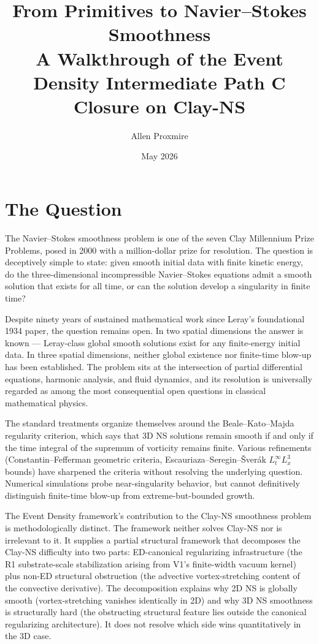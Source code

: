 \documentclass[11pt,a4paper]{article}
\title{\vspace{-1cm}\Large\bfseries From Primitives to Navier--Stokes Smoothness\\[6pt]
\large\mdseries A Walkthrough of the Event Density Intermediate Path C Closure on Clay-NS}
\author{Allen Proxmire}
\date{May 2026}
\begin{document}
\maketitle
\thispagestyle{empty}

\section{The Question}

The Navier--Stokes smoothness problem is one of the seven Clay Millennium Prize Problems, posed in 2000 with a million-dollar prize for resolution. The question is deceptively simple to state: given smooth initial data with finite kinetic energy, do the three-dimensional incompressible Navier--Stokes equations admit a smooth solution that exists for all time, or can the solution develop a singularity in finite time?

Despite ninety years of sustained mathematical work since Leray's foundational 1934 paper, the question remains open. In two spatial dimensions the answer is known --- Leray-class global smooth solutions exist for any finite-energy initial data. In three spatial dimensions, neither global existence nor finite-time blow-up has been established. The problem sits at the intersection of partial differential equations, harmonic analysis, and fluid dynamics, and its resolution is universally regarded as among the most consequential open questions in classical mathematical physics.

The standard treatments organize themselves around the Beale--Kato--Majda regularity criterion, which says that 3D NS solutions remain smooth if and only if the time integral of the supremum of vorticity remains finite. Various refinements (Constantin--Fefferman geometric criteria, Escauriaza--Seregin--\v Sver\'ak $L^\infty_t L^3_x$ bounds) have sharpened the criteria without resolving the underlying question. Numerical simulations probe near-singularity behavior, but cannot definitively distinguish finite-time blow-up from extreme-but-bounded growth.

The Event Density framework's contribution to the Clay-NS smoothness problem is methodologically distinct. The framework neither solves Clay-NS nor is irrelevant to it. It supplies a partial structural framework that decomposes the Clay-NS difficulty into two parts: ED-canonical regularizing infrastructure (the R1 substrate-scale stabilization arising from V1's finite-width vacuum kernel) plus non-ED structural obstruction (the advective vortex-stretching content of the convective derivative). The decomposition explains why 2D NS is globally smooth (vortex-stretching vanishes identically in 2D) and why 3D NS smoothness is structurally hard (the obstructing structural feature lies outside the canonical regularizing architecture). It does not resolve which side wins quantitatively in the 3D case.
\end{document}
